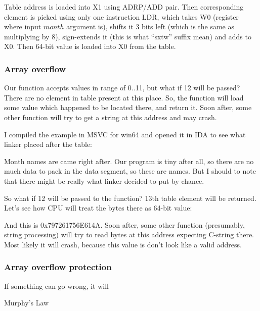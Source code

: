 

Table address is loaded into X1 using ADRP/ADD pair.
Then corresponding element is picked using only one instruction LDR, which takes W0 
(register where input $month$ argument is), shifts it 3 bits left (which is the same as multiplying by 8), 
sign-extends it (this is what ``sxtw'' suffix mean) and adds to X0.
Then 64-bit value is loaded into X0 from the table.

\subsubsection{Array overflow}

Our function accepts values in range of 0..11, but what if 12 will be passed?
There are no element in table present at this place.
So, the function will load some value which happened to be located there, and return it.
Soon after, some other function will try to get a string at this address and may crash.

I compiled the example in MSVC for win64 and opened it in IDA to see what linker placed after the table:



Month names are came right after.
Our program is tiny after all, so there are no much data to pack in the data segment, so these are names.
But I should to note that there might be really  what linker decided to put by chance.

So what if 12 will be passed to the function?
13th table element will be returned.
Let's see how CPU will treat the bytes there as 64-bit value:



And this is 0x797261756E614A.
Soon after, some other function (presumably, string processing) will try to read bytes at 
this address expecting C-string there.
Most likely it will crash, because this value is don't look like a valid address.

\subsubsection{Array overflow protection}
\epigraph{If something can go wrong, it will}{Murphy's Law}


